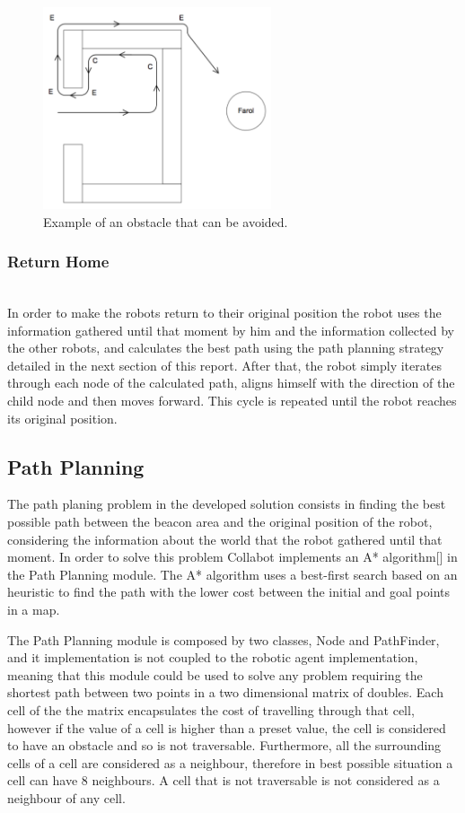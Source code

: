 \documentclass[oribibl]{llncs}
\begin{document}
\begin{figure}
  \centering
  \includegraphics[width=0.6\textwidth]{obstaculo1.png}
  \caption{Example of an obstacle that can be avoided.}
  \label{fig:obstacle1}
\end{figure}

\subsubsection{Return Home}\hfill \\

In order to make the robots return to their original position the robot uses the information gathered until that moment by him and the information collected by the other robots, and calculates the best path using the path planning strategy detailed in the next section of this report. After that, the robot simply iterates through each node of the calculated path, aligns himself with the direction of the child node and then moves forward. This cycle is repeated until the robot reaches its original position.

\subsection{Path Planning}
\label{sec:path-planning}
The path planing problem in the developed solution consists in finding the best possible path between the beacon area and the original position of the robot, considering the information about the world that the robot gathered until that moment. In order to solve this problem Collabot implements an A* algorithm[] in the Path Planning module. The A* algorithm uses a best-first search based on an heuristic to find the path with the lower cost between the initial and goal points in a map.

The Path Planning module is composed by two classes, Node and PathFinder, and it implementation is not coupled to the robotic agent implementation, meaning that this module could be used to solve any problem requiring the shortest path between two points in a two dimensional matrix of doubles. Each cell of the the matrix encapsulates the cost of travelling through that cell, however if the value of a cell is higher than a preset value, the cell is considered to have an obstacle and so is not traversable. Furthermore, all the surrounding cells of a cell are considered as a neighbour, therefore in best possible situation a cell can have 8 neighbours. A cell that is not traversable is not considered as a neighbour of any cell.
\end{document}
